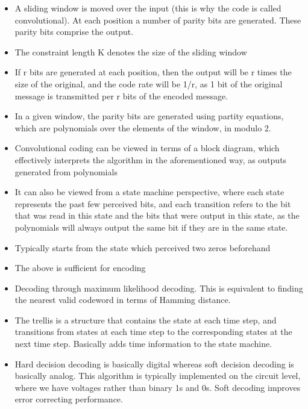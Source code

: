\documentclass{article}
\begin{document}
\begin{itemize}
\item A sliding window is moved over the input (this is why the code is called convolutional). At each position a number of parity bits are generated. These parity bits comprise the output.

\item The constraint length K denotes the size of the sliding window

\item If r bits are generated at each position, then the output will be r times
the size of the original, and the code rate will be 1/r, as 1 bit of the
original message is transmitted per r bits of the encoded message.

\item In a given window, the parity bits are generated using partity equations,
which are polynomials over the elements of the window, in modulo 2.

\item Convolutional coding can be viewed in terms of a block diagram, which
effectively interprets the algorithm in the aforementioned way, as outputs
generated from polynomials

\item It can also be viewed from a state machine perspective, where each state
represents the past few perceived bits, and each transition refers to the
bit that was read in this state and the bits that were output in this
state, as the polynomials will always output the same bit if they are in
the same state.

\item Typically starts from the state which perceived two zeros beforehand

\item The above is sufficient for encoding

\item Decoding through maximum likelihood decoding. This is equivalent to
finding the nearest valid codeword in terms of Hamming distance.

\item The trellis is a structure that contains the state at each time step,
and transitions from states at each time step to the corresponding states
at the next time step. Basically adds time information to the state
machine.

\item Hard decision decoding is basically digital whereas soft decision decoding
is basically analog. This algorithm is typically implemented on the
circuit level, where we have voltages rather than binary 1s and 0s. Soft
decoding improves error correcting performance.


\end{itemize}
\end{document}
